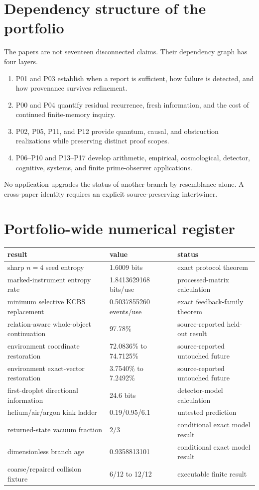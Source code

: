 \documentclass[11pt,a4paper]{article}
\begin{document}
\section{Dependency structure of the portfolio}
The papers are not seventeen disconnected claims. Their dependency graph has four layers.
\begin{enumerate}
\item P01 and P03 establish when a report is sufficient, how failure is detected, and how provenance survives refinement.
\item P00 and P04 quantify residual recurrence, fresh information, and the cost of continued finite-memory inquiry.
\item P02, P05, P11, and P12 provide quantum, causal, and obstruction realizations while preserving distinct proof scopes.
\item P06--P10 and P13--P17 develop arithmetic, empirical, cosmological, detector, cognitive, systems, and finite prime-observer applications.
\end{enumerate}
No application upgrades the status of another branch by resemblance alone. A cross-paper identity requires an explicit source-preserving intertwiner.

\section{Portfolio-wide numerical register}
\begin{longtable}{p{.42\linewidth}p{.22\linewidth}p{.25\linewidth}}
\toprule
result&value&status\\\midrule
sharp $n=4$ seed entropy&1.6009 bits&exact protocol theorem\\
marked-instrument entropy rate&1.8413629168 bits/use&processed-matrix calculation\\
minimum selective KCBS replacement&0.5037855260 events/use&exact feedback-family theorem\\
relation-aware whole-object continuation&97.78\%&source-reported held-out result\\
environment coordinate restoration&72.0836\% to 74.7125\%&source-reported untouched future\\
environment exact-vector restoration&3.7540\% to 7.2492\%&source-reported untouched future\\
first-droplet directional information&24.6 bits&detector-model calculation\\
helium/air/argon kink ladder&0.19/0.95/6.1&untested prediction\\
returned-state vacuum fraction&$2/3$&conditional exact model result\\
dimensionless branch age&0.9358813101&conditional exact model result\\
coarse/repaired collision fixture&6/12 to 12/12&executable finite result\\
\bottomrule
\end{longtable}
\end{document}

